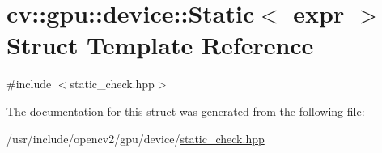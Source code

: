 \hypertarget{structcv_1_1gpu_1_1device_1_1Static}{\section{cv\-:\-:gpu\-:\-:device\-:\-:Static$<$ expr $>$ Struct Template Reference}
\label{structcv_1_1gpu_1_1device_1_1Static}
}


{\ttfamily \#include $<$static\-\_\-check.\-hpp$>$}



The documentation for this struct was generated from the following file\-:\begin{DoxyCompactItemize}
\item 
/usr/include/opencv2/gpu/device/\hyperlink{static__check_8hpp}{static\-\_\-check.\-hpp}\end{DoxyCompactItemize}
